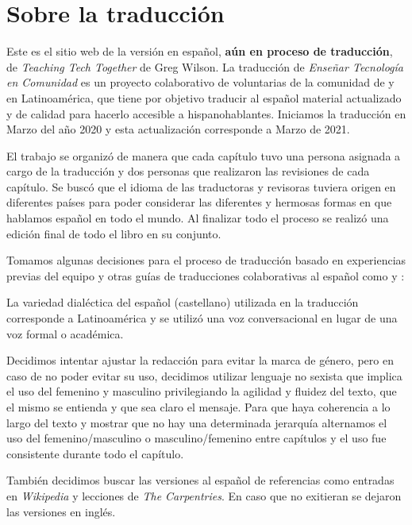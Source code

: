 \chapter*{Sobre la traducción}\label{s:traduccion}

Este es el sitio web de la versión en español, \textbf{aún en proceso de traducción}, de \emph{Teaching Tech Together} de Greg Wilson.
La traducción de \emph{Enseñar Tecnología en Comunidad} es un proyecto colaborativo
de voluntarias de la comunidad de  y 
 en Latinoamérica,
que tiene por objetivo traducir al español material actualizado 
y de calidad para hacerlo accesible a hispanohablantes.
Iniciamos la traducción en Marzo del año 2020 y esta actualización corresponde a Marzo de 2021.

El trabajo se organizó de manera que cada capítulo tuvo una persona asignada a cargo de la traducción 
y dos personas que realizaron las revisiones de cada capítulo.  
Se buscó que el idioma de las traductoras y revisoras tuviera origen en diferentes países para
poder considerar las diferentes y hermosas formas en que hablamos español en todo el mundo.
Al finalizar todo el proceso se realizó una edición final de todo el libro en su conjunto.

Tomamos algunas decisiones para el proceso de traducción basado en experiencias previas
del equipo y otras guías de traducciones colaborativas al español como 
y :

La variedad dialéctica del español (castellano) utilizada en la traducción corresponde 
a Latinoamérica y se utilizó una voz conversacional en lugar de una voz formal o académica.

Decidimos intentar ajustar la redacción para evitar la marca de género, pero
en caso de no poder evitar su uso, decidimos utilizar lenguaje no sexista  
que implica el uso del femenino y masculino privilegiando la agilidad y fluidez del texto, 
que el mismo se entienda y que sea claro el mensaje. Para que haya coherencia 
a lo largo del texto y mostrar que no hay una determinada jerarquía 
alternamos el uso del femenino/masculino o masculino/femenino entre capítulos 
y el uso fue consistente durante todo el capítulo. 

También decidimos buscar las versiones al español de referencias como 
entradas en \emph{Wikipedia} y lecciones de \emph{The Carpentries}.  En caso que no exitieran 
se dejaron las versiones en inglés.

